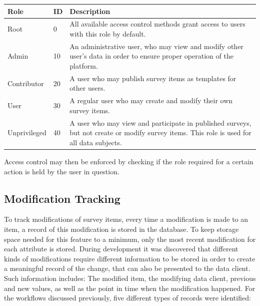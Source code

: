 \documentclass[a4paper,11pt]{article}
\begin{document}
                \begin{table}[H]
                    \begin{tabularx}{\textwidth}{|l|l|X|}
                        \hline
                        Role & ID & Description \\
                        \hline \hline
                        Root & 0 & All available access control methods grant access to users with this role by default. \\
                        Admin & 10 & An administrative user, who may view and modify other user's data in order to ensure proper operation of the platform. \\
                        Contributor & 20 & A user who may publish survey items as templates for other users. \\
                        User & 30 & A regular user who may create and modify their own survey items. \\
                        Unprivileged & 40 & A user who may view and participate in published surveys, but not create or modify survey items. This role is used for all data subjects.\\
                        \hline
                    \end{tabularx}
                \end{table}

                Access control may then be enforced by checking if the role required
                for a certain action is held by the user in question.

            \subsection{Modification Tracking}
                To track modifications of survey items, every time a modification
                is made to an item, a record of this modification is stored in the
                database. To keep storage space needed for this feature to a minimum,
                only the most recent modification for each attribute is stored.
                During development it was discovered that different kinds of modifications
                require different information to be stored in order to create a meaningful
                record of the change, that can also be presented to the data client.
                Such information includes: The modified item, the modifying data client,
                previous and new values, as well as the point in time when the modification
                happened. For the workflows discussed previously, five different types
                of records were identified:
\end{document}
